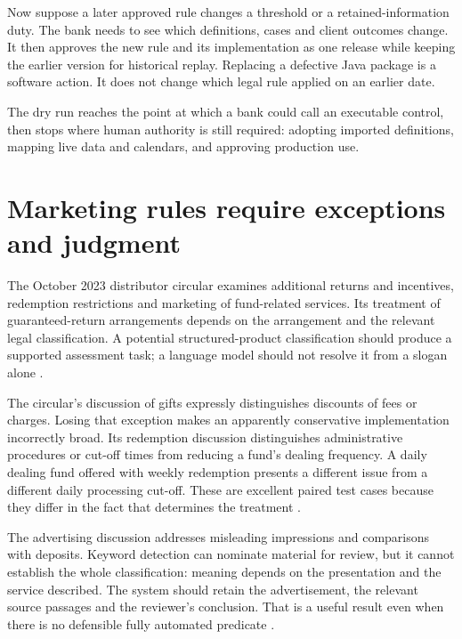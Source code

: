 \documentclass[12pt,a4paper,oneside,openany]{book}
\begin{document}
Now suppose a later approved rule changes a threshold or a retained-information
duty. The bank needs to see which definitions, cases and client outcomes change.
It then approves the new rule and its implementation as one release while
keeping the earlier version for historical replay. Replacing a defective Java
package is a software action. It does not change which legal rule applied on an
earlier date.

The dry run reaches the point at which a bank could call an executable control,
then stops where human authority is still required: adopting imported
definitions, mapping live data and calendars, and approving production use.

\section{Marketing rules require exceptions and judgment}
\label{merge:P-01-problem:04}


The October 2023 distributor circular examines additional returns and incentives,
redemption restrictions and marketing of fund-related services. Its treatment of
guaranteed-return arrangements depends on the arrangement and the relevant legal
classification. A potential structured-product classification should produce a
supported assessment task; a language model should not resolve it from a slogan
alone \citep[paras.~5--11]{sfcmarketing}.

The circular's discussion of gifts expressly distinguishes discounts of fees or
charges. Losing that exception makes an apparently conservative implementation
incorrectly broad. Its redemption discussion distinguishes administrative
procedures or cut-off times from reducing a fund's dealing frequency. A daily
dealing fund offered with weekly redemption presents a different issue from a
different daily processing cut-off. These are excellent paired test cases because
they differ in the fact that determines the treatment
\citep[paras.~9--14]{sfcmarketing}.

The advertising discussion addresses misleading impressions and comparisons with
deposits. Keyword detection can nominate material for review, but it cannot
establish the whole classification: meaning depends on the presentation and the
service described. The system should retain the advertisement, the relevant
source passages and the reviewer's conclusion. That is a useful result even when
there is no defensible fully automated predicate
\citep[paras.~15--17]{sfcmarketing}.
\end{document}
